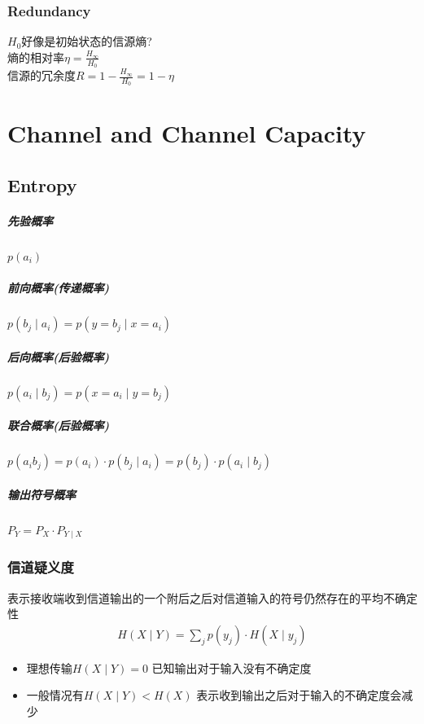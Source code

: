 \documentclass[a4paper]{report}
\begin{document}
\subsection{Redundancy}
$H_0$好像是初始状态的信源熵? \\
熵的相对率$\eta=\frac{H_\infty}{H_0}$ \\
信源的冗余度$R=1-\frac{H_\infty}{H_0}=1-\eta$

\chapter{Channel and Channel Capacity}

\section{Entropy}
\paragraph{先验概率}$p(a_i)$
\paragraph{前向概率(传递概率)}$p(b_j\mid a_i)=p(y=b_j\mid x=a_i)$
\paragraph{后向概率(后验概率)}$p(a_i\mid b_j)=p(x=a_i\mid y=b_j)$
\paragraph{联合概率(后验概率)}$p(a_i b_j)=p(a_i)\cdot p(b_j\mid a_i)=p(b_j)\cdot p(a_i\mid b_j)$
\paragraph{输出符号概率}$P_Y=P_X\cdot P_{Y\mid X}$
\subsection{信道疑义度}
表示接收端收到信道输出的一个附后之后对信道输入的符号仍然存在的平均不确定性
\begin{align*}
  H(X\mid Y)=\displaystyle\sum_{j} p(y_j)\cdot H(X\mid y_j)
\end{align*}
\begin{itemize}
  \item 理想传输$H(X\mid Y)=0$ 已知输出对于输入没有不确定度
  \item 一般情况有$H(X\mid Y)< H(X)$ 表示收到输出之后对于输入的不确定度会减少
\end{itemize}
\end{document}
